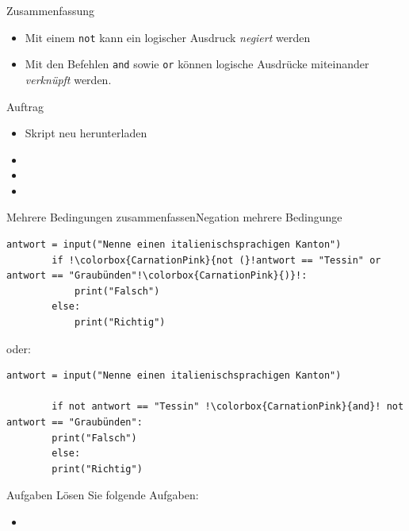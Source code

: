 \begin{frame}[fragile]{Zusammenfassung}
    \begin{itemize}
        \item Mit einem \lstinline|not| kann ein logischer Ausdruck \textit{negiert} werden
        \item Mit den Befehlen \lstinline|and| sowie \lstinline|or| können logische Ausdrücke miteinander \textit{verknüpft} werden.
    \end{itemize}
\end{frame}

\begin{frame}{Auftrag}
    \begin{itemize}
        \item Skript neu herunterladen
        \item {}
        \item {}
        \item {}
    \end{itemize}
\end{frame}


\begin{frame}[fragile]{Mehrere Bedingungen zusammenfassen}{Negation mehrere Bedingunge}
    \begin{lstlisting}[escapechar=!, basicstyle=\ttfamily\footnotesize]
        antwort = input("Nenne einen italienischsprachigen Kanton")
        if !\colorbox{CarnationPink}{not (}!antwort == "Tessin" or antwort == "Graubünden"!\colorbox{CarnationPink}{)}!:
            print("Falsch")
        else:
            print("Richtig")
    \end{lstlisting}
    
    oder:
    
    \begin{lstlisting}[escapechar=!, basicstyle=\ttfamily\footnotesize]
        antwort = input("Nenne einen italienischsprachigen Kanton")
        
        if not antwort == "Tessin" !\colorbox{CarnationPink}{and}! not antwort == "Graubünden":
        print("Falsch")
        else:
        print("Richtig")
    \end{lstlisting}
\end{frame}

\begin{frame}{Aufgaben}
    Lösen Sie folgende Aufgaben:
    \begin{itemize}
        \item {}
    \end{itemize}
\end{frame}